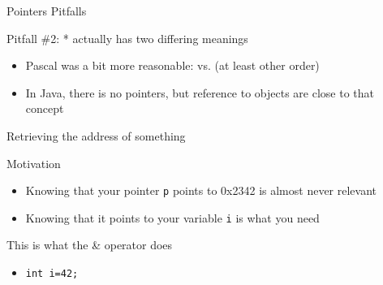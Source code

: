 \begin{Coupe}
\begin{frame}{Pointers Pitfalls}
\begin{block}{Pitfall \#2: * actually has two differing meanings}
\begin{itemize}
    \item Pascal was a bit more reasonable: 
      vs.  {\small(at least other order)}
    \item In Java, there is no pointers, but reference to objects are close to
      that concept
    \end{itemize}
  \end{block}
\end{frame}
\begin{frame}{Retrieving the address of something}
  \begin{block}{Motivation}
    \begin{itemize}
    \item Knowing that your pointer \texttt{p} points to 0x2342 is almost never relevant
    \item Knowing that it points to your variable \texttt{i} is what you need
    \end{itemize}
  \end{block}\vspace{-.5\baselineskip}
  \begin{block}{This is what the \alert{\&} operator does}
    \begin{itemize}
    \item \texttt{int i=42; }
    \end{itemize}
  \end{block}\vspace{-.5\baselineskip}


\end{frame}
\end{Coupe}
